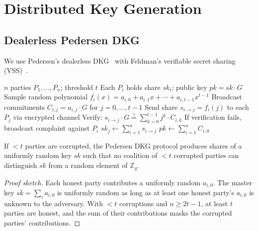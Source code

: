 \section{Distributed Key Generation}

\label{sec:dkg}

\subsection{Dealerless Pedersen DKG}

We use Pedersen's dealerless DKG~\cite{pedersen1991threshold} with Feldman's
verifiable secret sharing (VSS)~\cite{feldman1987practical}.

\begin{algorithm}[ht]
\caption{Dealerless DKG for $(t, n)$ threshold.}
\label{alg:dkg}
\begin{algorithmic}[1]
\Require $n$ parties $P_1, \ldots, P_n$; threshold $t$
\Ensure Each $P_i$ holds share $sk_i$; public key $pk = sk \cdot G$
  \State Sample random polynomial $f_i(x) = a_{i,0} + a_{i,1}x + \cdots + a_{i,t-1}x^{t-1}$
  \State Broadcast commitments $C_{i,j} = a_{i,j} \cdot G$ for $j = 0, \ldots, t-1$
  \State Send share $s_{i \to j} = f_i(j)$ to each $P_j$ via encrypted channel
\EndFor
{}
    \State Verify: $s_{i \to j} \cdot G \stackrel{?}{=} \sum_{k=0}^{t-1} j^k \cdot C_{i,k}$
    \State If verification fails, broadcast complaint against $P_i$
  \EndFor
  \State $sk_j \leftarrow \sum_{i=1}^{n} s_{i \to j}$ 
\EndFor
\State $pk \leftarrow \sum_{i=1}^{n} C_{i,0}$ 
\end{algorithmic}
\end{algorithm}

\begin{theorem}
\label{thm:dkg}
If $< t$ parties are corrupted, the Pedersen DKG protocol produces shares of a
uniformly random key $sk$ such that no coalition of $< t$ corrupted parties can
distinguish $sk$ from a random element of $\mathbb{Z}_q$.
\end{theorem}

\begin{proof}[Proof sketch]
Each honest party contributes a uniformly random $a_{i,0}$. The master key
$sk = \sum_i a_{i,0}$ is uniformly random as long as at least one honest party's
$a_{i,0}$ is unknown to the adversary. With $< t$ corruptions and $n \geq 2t - 1$,
at least $t$ parties are honest, and the sum of their contributions masks the
corrupted parties' contributions.
\end{proof}

